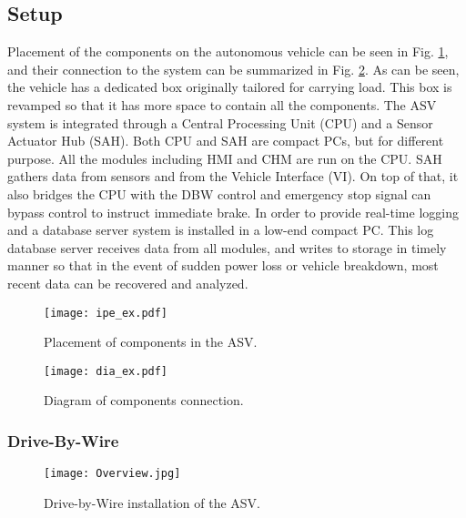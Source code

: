 \documentclass[10 pt,a4paper,conference]{IEEEtran}
\begin{document}
\subsection{Setup}\label{setup}

Placement of the components on the autonomous vehicle can be seen in
Fig. \ref{ipe_ex}, and their connection to the system can be summarized
in Fig. \ref{dia_ex}. As can be seen, the vehicle has a dedicated box
originally tailored for carrying load. This box is revamped so that it
has more space to contain all the components. The ASV system is
integrated through a Central Processing Unit (CPU) and a Sensor Actuator
Hub (SAH). Both CPU and SAH are compact PCs, but for different purpose.
All the modules including HMI and CHM are run on the CPU. SAH gathers
data from sensors and from the Vehicle Interface (VI). On top of that,
it also bridges the CPU with the DBW control and emergency stop signal
can bypass control to instruct immediate brake. In order to provide
real-time logging and a database server system is installed in a low-end
compact PC. This log database server receives data from all modules, and
writes to storage in timely manner so that in the event of sudden power
loss or vehicle breakdown, most recent data can be recovered and
analyzed.

\begin{figure}[!t]
\centering
\texttt{[image: ipe\_ex.pdf]}
\caption{Placement of components in the ASV.}
\label{ipe_ex}
\end{figure}

\begin{figure}[!t]
\centering
\texttt{[image: dia\_ex.pdf]}
\caption{Diagram of components connection.}
\label{dia_ex}
\end{figure}

\subsubsection{Drive-By-Wire}\label{drive-by-wire}

\begin{figure}[!t]
\centering
\texttt{[image: Overview.jpg]}
\caption{Drive-by-Wire installation of the ASV.}
\label{fig_DBW}
\end{figure}
\end{document}

